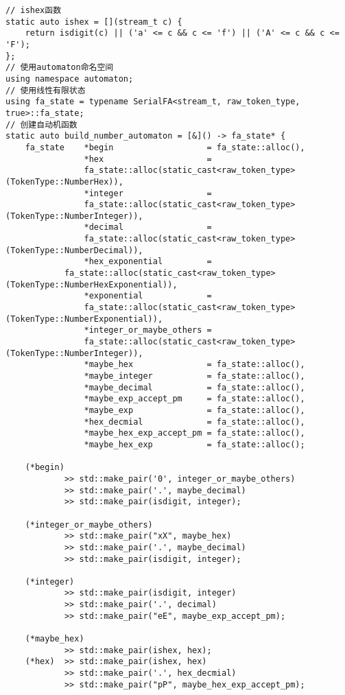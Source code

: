 \documentclass[UTF8]{ctexart}
\begin{document}
{\firacode
\begin{lstlisting}[language={[ANSI]C++}]
// ishex函数
static auto ishex = [](stream_t c) {
    return isdigit(c) || ('a' <= c && c <= 'f') || ('A' <= c && c <= 'F');
};
// 使用automaton命名空间
using namespace automaton;
// 使用线性有限状态
using fa_state = typename SerialFA<stream_t, raw_token_type, true>::fa_state;
// 创建自动机函数
static auto build_number_automaton = [&]() -> fa_state* {
    fa_state    *begin                   = fa_state::alloc(),
                *hex                     = 
                fa_state::alloc(static_cast<raw_token_type>(TokenType::NumberHex)),
                *integer                 = 
                fa_state::alloc(static_cast<raw_token_type>(TokenType::NumberInteger)),
                *decimal                 = 
                fa_state::alloc(static_cast<raw_token_type>(TokenType::NumberDecimal)),
                *hex_exponential         = 
            fa_state::alloc(static_cast<raw_token_type>(TokenType::NumberHexExponential)),
                *exponential             = 
                fa_state::alloc(static_cast<raw_token_type>(TokenType::NumberExponential)),
                *integer_or_maybe_others = 
                fa_state::alloc(static_cast<raw_token_type>(TokenType::NumberInteger)),
                *maybe_hex               = fa_state::alloc(),
                *maybe_integer           = fa_state::alloc(),
                *maybe_decimal           = fa_state::alloc(),
                *maybe_exp_accept_pm     = fa_state::alloc(),
                *maybe_exp               = fa_state::alloc(),
                *hex_decmial             = fa_state::alloc(),
                *maybe_hex_exp_accept_pm = fa_state::alloc(),
                *maybe_hex_exp           = fa_state::alloc();
    
    (*begin)
            >> std::make_pair('0', integer_or_maybe_others)
            >> std::make_pair('.', maybe_decimal)
            >> std::make_pair(isdigit, integer);

    (*integer_or_maybe_others)
            >> std::make_pair("xX", maybe_hex)
            >> std::make_pair('.', maybe_decimal)
            >> std::make_pair(isdigit, integer);
    
    (*integer)
            >> std::make_pair(isdigit, integer)
            >> std::make_pair('.', decimal)
            >> std::make_pair("eE", maybe_exp_accept_pm);
    
    (*maybe_hex)
            >> std::make_pair(ishex, hex);
    (*hex)  >> std::make_pair(ishex, hex)
            >> std::make_pair('.', hex_decmial)
            >> std::make_pair("pP", maybe_hex_exp_accept_pm);
    

\end{lstlisting}}
\end{document}
